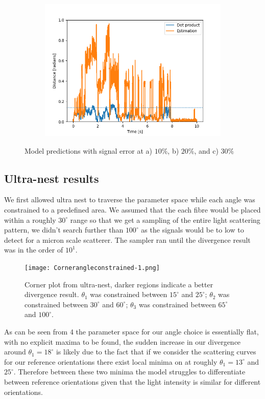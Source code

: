 \documentclass[11pt]{article}
\begin{document}
\begin{figure}[b]
\begin{subfigure}{0.33\textwidth}
		\end{subfigure}
		\begin{subfigure}{0.33\textwidth}
			\includegraphics[width=\textwidth]{Error_30_percent.png}
		\end{subfigure}
		\caption{Model predictions with signal error at a) $10 \%$, b)  $20\%$, and c) $30\%$}
	\end{figure}
	
	\subsection*{Ultra-nest results}
	We first allowed ultra nest to traverse the parameter space while each angle was constrained to a predefined area. We assumed that the each fibre would be placed within a roughly $30^{\circ}$ range so that we get a sampling of the entire light scattering pattern, we didn't search further than $100^{\circ}$ as the signals would be to low to detect for a micron scale scatterer. The sampler ran until the divergence result was in the order of $10^1$.
	
	\begin{figure} [t]
		\centering
		\texttt{[image: Cornerangleconstrained-1.png]}
		\caption{Corner plot from ultra-nest, darker regions indicate a better divergence result. $\theta_1$ was constrained between $15^{\circ}$ and $25^{\circ}$; $\theta_2$ was constrained between $30^{\circ}$ and $60^{\circ}$; $\theta_3$ was constrained between $65^{\circ}$ and $100^{\circ}$.}
	\end{figure}
	As can be seen from \figurename{ 4} the parameter space for our angle choice is essentially flat, with no explicit maxima to be found, the sudden increase in our divergence around $\theta_1 = 18^{\circ}$ is likely due to the fact that if we consider the scattering curves for our reference orientations there exist local minima on at roughly $\theta_1 = 13^{\circ}$ and $25^{\circ}$. Therefore between these two minima the model struggles to differentiate between reference orientations given that the light intensity is similar for different orientations. 
	
\end{document}
